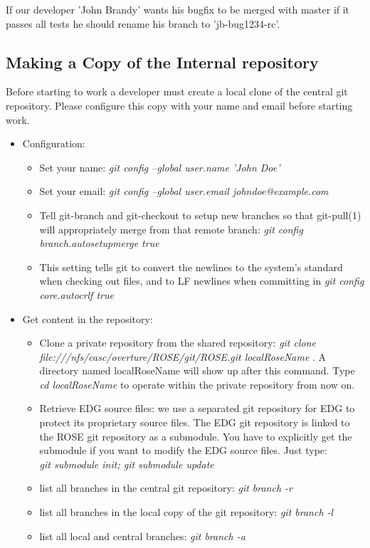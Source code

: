 If our developer 'John Brandy' wants his bugfix to be merged with master if it passes
all tests he should rename his branch to 'jb-bug1234-rc'.


\subsection{Making a Copy of the Internal repository}



Before starting to work a developer must create a local clone of the central git repository.
Please configure this copy with your name and email before starting work.

\begin{itemize}

\item Configuration:
  \begin{itemize}
          \item Set your name: \textit{git config --global user.name 'John Doe' }
	  \item Set your email: \textit{git config --global user.email johndoe@example.com}
	  \item Tell git-branch and git-checkout to setup new branches so that git-pull(1)
    will appropriately merge from that remote branch: \textit{git config branch.autosetupmerge true}
          \item This setting tells git to convert the newlines to the system’s standard
	    when checking out files, and to LF newlines when committing in \textit{git config core.autocrlf true}
   \end{itemize}       
\item Get content in the repository:
  \begin{itemize}
          \item Clone a private repository from the shared repository: \textit{git clone 
          file:///nfs/casc/overture/ROSE/git/ROSE.git localRoseName} . A
          directory named localRoseName will show up after this 
           command. Type \textit{cd localRoseName} to operate within the private repository from now on.
           \item Retrieve EDG source files: we use a separated git
           repository for EDG to protect its proprietary source files. The
           EDG git repository is linked to the ROSE git repository as a
           submodule. You have to explicitly get the submodule if you want to
           modify the EDG source files. Just type:
           \\ \textit{git submodule init; git submodule update}
          \item list all branches in the central git repository: \textit{git branch -r}
          \item list all branches in the local copy of the git repository: \textit{git branch -l}
          \item list all local and central branches: \textit{git branch -a}


\end{itemize}
\end{itemize}
